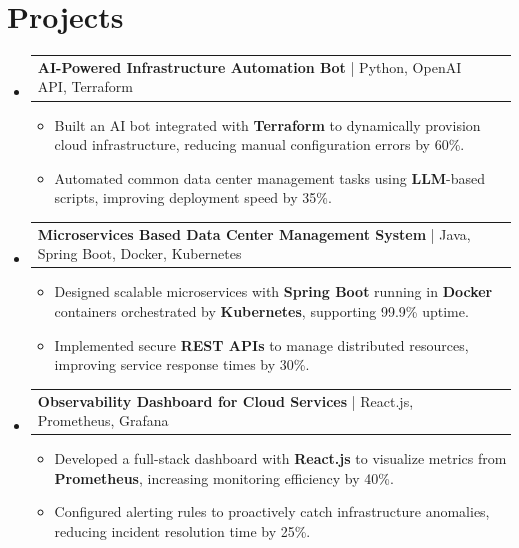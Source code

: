 \documentclass[letterpaper,11pt]{article}
\makeatletter
\newcommand{\resumeItem}[1]{
  \item\footnotesize{
    {#1 \vspace{-2pt}}
  }
}
\newcommand{\resumeProjectHeading}[2]{
    \item
    \begin{tabular*}{1.001\textwidth}{l@{\extracolsep{\fill}}r}
      \small#1 & \textbf{\small #2}\\
    \end{tabular*}\vspace{-7pt}
}
\newcommand{\resumeSubHeadingListStart}{\begin{itemize}[leftmargin=0pt, label={}]}
\newcommand{\resumeSubHeadingListEnd}{\end{itemize}}
\newcommand{\resumeItemListStart}{\begin{itemize}[leftmargin=*]}
\newcommand{\resumeItemListEnd}{\end{itemize}\vspace{-5pt}}
\makeatother
\begin{document}
\section{Projects}
    \vspace{-5pt}
    \resumeSubHeadingListStart
      \resumeProjectHeading
          {\textbf{AI-Powered Infrastructure Automation Bot} | Python, OpenAI API, Terraform}{}
          \resumeItemListStart
              \resumeItem{Built an AI bot integrated with \textbf{Terraform} to dynamically provision cloud infrastructure, reducing manual configuration errors by 60\%.}
              \resumeItem{Automated common data center management tasks using \textbf{LLM}-based scripts, improving deployment speed by 35\%.}
          \resumeItemListEnd
          \vspace{-12pt}
      \resumeProjectHeading
          {\textbf{Microservices Based Data Center Management System} | Java, Spring Boot, Docker, Kubernetes}{}
          \resumeItemListStart
              \resumeItem{Designed scalable microservices with \textbf{Spring Boot} running in \textbf{Docker} containers orchestrated by \textbf{Kubernetes}, supporting 99.9\% uptime.}
              \resumeItem{Implemented secure \textbf{REST APIs} to manage distributed resources, improving service response times by 30\%.}
          \resumeItemListEnd
          \vspace{-12pt}
      \resumeProjectHeading
          {\textbf{Observability Dashboard for Cloud Services} | React.js, Prometheus, Grafana}{}
          \resumeItemListStart
              \resumeItem{Developed a full-stack dashboard with \textbf{React.js} to visualize metrics from \textbf{Prometheus}, increasing monitoring efficiency by 40\%.}
              \resumeItem{Configured alerting rules to proactively catch infrastructure anomalies, reducing incident resolution time by 25\%.}
          \resumeItemListEnd
    \resumeSubHeadingListEnd
\end{document}
